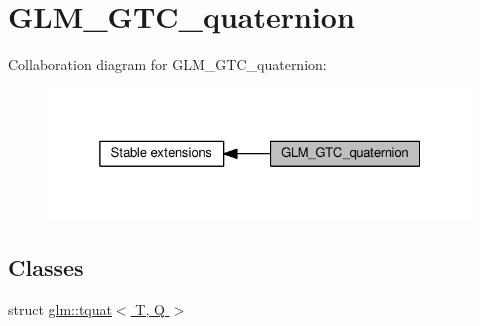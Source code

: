 \hypertarget{group__gtc__quaternion}{}\section{G\+L\+M\+\_\+\+G\+T\+C\+\_\+quaternion}
\label{group__gtc__quaternion}
Collaboration diagram for G\+L\+M\+\_\+\+G\+T\+C\+\_\+quaternion\+:
\nopagebreak
\begin{figure}[H]
\begin{center}
\leavevmode
\includegraphics[width=325pt]{d5/d66/group__gtc__quaternion}
\end{center}
\end{figure}
\subsection*{Classes}
\begin{DoxyCompactItemize}
\item 
struct \hyperlink{structglm_1_1tquat}{glm\+::tquat$<$ T, Q $>$}
\end{DoxyCompactItemize}
